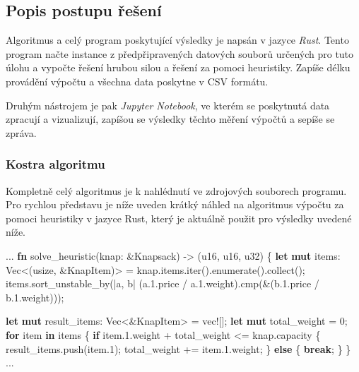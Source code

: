 \documentclass[11pt]{article}
\newenvironment{Shaded}{}{}
\newcommand{\KeywordTok}[1]{\textcolor[rgb]{0.00,0.44,0.13}{\textbf{{#1}}}}
\newcommand{\DataTypeTok}[1]{\textcolor[rgb]{0.56,0.13,0.00}{{#1}}}
\newcommand{\DecValTok}[1]{\textcolor[rgb]{0.25,0.63,0.44}{{#1}}}
\newcommand{\NormalTok}[1]{{#1}}
\newcommand{\OperatorTok}[1]{\textcolor[rgb]{0.40,0.40,0.40}{{#1}}}
\newcommand{\PreprocessorTok}[1]{\textcolor[rgb]{0.74,0.48,0.00}{{#1}}}
\begin{document}
\subsection{Popis postupu řešení}\label{popis-postupu-ux159eux161enuxed}

Algoritmus a celý program poskytující výsledky je napsán v jazyce
\emph{Rust}. Tento program načte instance z předpřipravených datových
souborů určených pro tuto úlohu a vypočte řešení hrubou silou a řešení
za pomoci heuristiky. Zapíše délku provádění výpočtu a všechna data
poskytne v CSV formátu.

Druhým nástrojem je pak \emph{Jupyter Notebook}, ve kterém se poskytnutá
data zpracují a vizualizují, zapíšou se výsledky těchto měření výpočtů a
sepíše se zpráva.

\subsubsection{Kostra algoritmu}\label{kostra-algoritmu}

Kompletně celý algoritmus je k nahlédnutí ve zdrojových souborech
programu. Pro rychlou představu je níže uveden krátký náhled na
algoritmus výpočtu za pomoci heuristiky v jazyce Rust, který je aktuálně
použit pro výsledky uvedené níže.

\begin{Shaded}
\begin{Highlighting}[]
\NormalTok{...}
\KeywordTok{fn}\NormalTok{ solve_heuristic(knap: &Knapsack) -> (}\DataTypeTok{u16}\NormalTok{, }\DataTypeTok{u16}\NormalTok{, }\DataTypeTok{u32}\NormalTok{) }\OperatorTok{\{}
    \KeywordTok{let} \KeywordTok{mut}\NormalTok{ items: }\DataTypeTok{Vec}\NormalTok{<(}\DataTypeTok{usize}\NormalTok{, &KnapItem)> = knap.items.iter().enumerate().collect();}
\NormalTok{    items.sort_unstable_by(|a, b| (a.}\DecValTok{1.}\NormalTok{price / a.}\DecValTok{1.}\NormalTok{weight).cmp(&(b.}\DecValTok{1.}\NormalTok{price / b.}\DecValTok{1.}\NormalTok{weight)));}
    
    \KeywordTok{let} \KeywordTok{mut}\NormalTok{ result_items: }\DataTypeTok{Vec}\NormalTok{<&KnapItem> = }\PreprocessorTok{vec!}\OperatorTok{[]}\NormalTok{;}
    \KeywordTok{let} \KeywordTok{mut}\NormalTok{ total_weight = }\DecValTok{0}\NormalTok{;}
    \KeywordTok{for}\NormalTok{ item }\KeywordTok{in}\NormalTok{ items }\OperatorTok{\{}
        \KeywordTok{if}\NormalTok{ item.}\DecValTok{1.}\NormalTok{weight + total_weight <= knap.capacity }\OperatorTok{\{}
\NormalTok{            result_items.push(item.}\DecValTok{1}\NormalTok{);}
\NormalTok{            total_weight += item.}\DecValTok{1.}\NormalTok{weight;}
        \OperatorTok{\}} \KeywordTok{else} \OperatorTok{\{}
            \KeywordTok{break}\NormalTok{;}
        \OperatorTok{\}}
    \OperatorTok{\}}
\NormalTok{...}
\end{Highlighting}
\end{Shaded}
\end{document}
